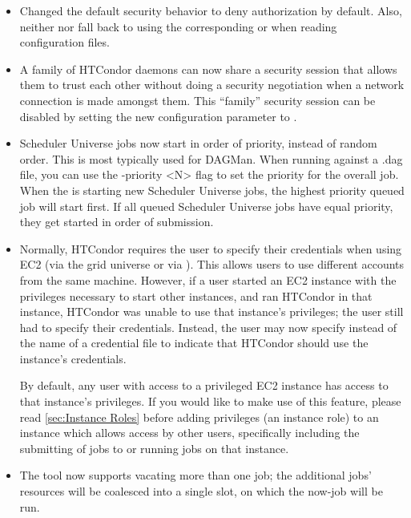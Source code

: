 \begin{itemize}

\item Changed the default security behavior to deny authorization by default.
Also, neither  nor  fall back
to using the corresponding  or 
when reading configuration files.

\item A family of HTCondor daemons can now share a security session that
allows them to trust each other without doing a security negotiation
when a network connection is made amongst them.
This ``family'' security session can be disabled by setting the new
configuration parameter  to .

\item Scheduler Universe jobs now start in order of priority, instead of random
order. This is most typically used for DAGMan. When running 
against a .dag file, you can use the -priority <N> flag to set the priority
for the overall  job. When the  is starting new
Scheduler Universe jobs, the highest priority queued job will start first. If
all queued Scheduler Universe jobs have equal priority, they get started in
order of submission.

\item  Normally, HTCondor requires the user to specify their credentials
when using EC2 (via the grid universe or via ).  This allows
users to use different accounts from the same machine.  However,
if a user started an EC2 instance with the privileges necessary to start
other instances, and ran HTCondor in that instance, HTCondor was unable to
use that instance's privileges; the user still had to specify their
credentials.  Instead, the user may now specify  instead
of the name of a credential file to indicate that HTCondor should use the
instance's credentials.

By default, any user with access to a privileged EC2 instance has access to
that instance's privileges.  If you would like to make use of this feature,
please read \ref{sec:Instance Roles} before adding privileges (an instance
role) to an instance which allows access by other users, specifically
including the submitting of jobs to or running jobs on that instance.

\item The  tool now supports vacating more than one job; the
additional jobs' resources will be coalesced into a single slot, on which
the now-job will be run.


\end{itemize}
